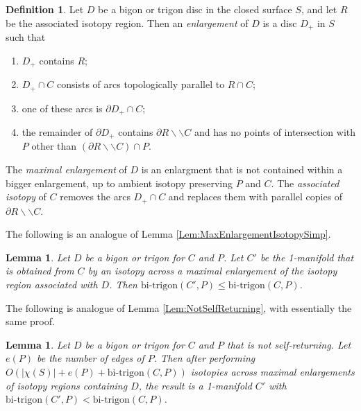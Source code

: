 \documentclass[oneside]{amsart}
\numberwithin{equation}{section}
\theoremstyle{plain}
\newtheorem{lemma}[equation]{Lemma}
\theoremstyle{definition}
\newtheorem{definition}[equation]{Definition}
\newcommand{\cut}{\backslash\backslash}
\begin{document}
\begin{definition}
Let $D$ be a bigon or trigon disc in the closed surface $S$, and let $R$ be the associated isotopy region. Then an \emph{enlargement} of $D$ is a disc $D_+$ in $S$ such that 
\begin{enumerate}
\item $D_+$ contains $R$;
\item $D_+ \cap C$ consists of arcs topologically parallel to $R \cap C$;
\item one of these arcs is $\partial D_+ \cap C$;
\item the remainder of $\partial D_+$ contains $\partial R \cut C$ and has no points of intersection with $P$ other than $(\partial R \cut C) \cap P$.
\end{enumerate}
The \emph{maximal enlargement} of $D$ is an enlargment that is not contained within a bigger enlargement, up to ambient isotopy preserving $P$ and $C$. The \emph{associated isotopy} of $C$ removes the arcs $D_+ \cap C$ and replaces them with parallel copies of $\partial R \cut C$.
\end{definition}

The following is an analogue of Lemma \ref{Lem:MaxEnlargementIsotopySimp}.

\begin{lemma}
\label{Lem:MaxEnlargementIsotopyTrigon}
Let $D$ be a bigon or trigon for $C$ and $P$. Let $C'$ be the 1-manifold that is obtained from $C$ by an isotopy across a maximal enlargement of the isotopy region associated with $D$. Then $\mathrm{bi}\text{-}\mathrm{trigon}(C', P) \leq \mathrm{bi}\text{-}\mathrm{trigon}(C, P)$.
\end{lemma} 

The following is analogue of Lemma \ref{Lem:NotSelfReturning}, with essentially the same proof.

\begin{lemma}
\label{Lem:TrigonNotSelfReturning}
Let $D$ be a bigon or trigon for $C$ and $P$ that is not self-returning. Let $e(P)$ be the number of edges of $P$. Then after performing $O(|\chi(S)| + e(P) + \mathrm{bi}\text{-}\mathrm{trigon}(C, P))$ isotopies across maximal enlargements of isotopy regions containing $D$, the result is a 1-manifold $C'$ with $\mathrm{bi}\text{-}\mathrm{trigon}(C', P) < \mathrm{bi}\text{-}\mathrm{trigon}(C, P)$.
\end{lemma}  
\end{document}
